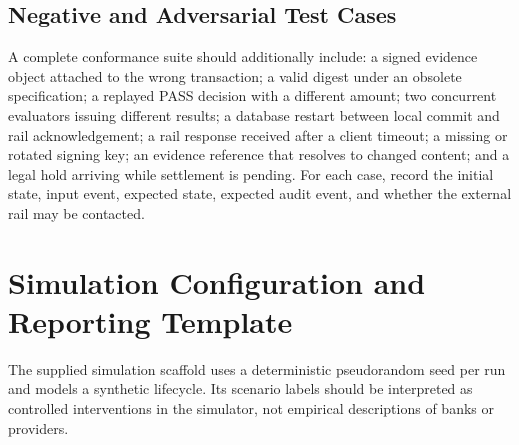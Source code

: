 \documentclass[12pt,a4paper,oneside]{report}
\begin{document}
\section{Negative and Adversarial Test Cases}
A complete conformance suite should additionally include: a signed evidence object attached to the wrong transaction; a valid digest under an obsolete specification; a replayed PASS decision with a different amount; two concurrent evaluators issuing different results; a database restart between local commit and rail acknowledgement; a rail response received after a client timeout; a missing or rotated signing key; an evidence reference that resolves to changed content; and a legal hold arriving while settlement is pending. For each case, record the initial state, input event, expected state, expected audit event, and whether the external rail may be contacted.

\chapter{Simulation Configuration and Reporting Template}
The supplied simulation scaffold uses a deterministic pseudorandom seed per run and models a synthetic lifecycle. Its scenario labels should be interpreted as controlled interventions in the simulator, not empirical descriptions of banks or providers.
\end{document}
